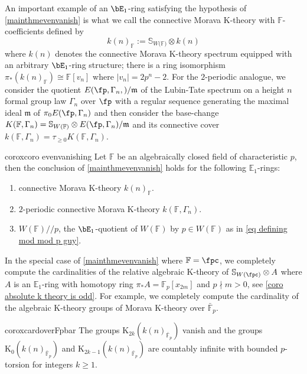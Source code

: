 \documentclass[english,10pt]{amsart}
\newcommand{\sphwf}{\mathbb{S}_{W(\mathbb{F)}}}
\newcommand{\field}{\mathbb{F}}
\theoremstyle{definition}
\numberwithin{equation}{section}
\newcommand{\mmod}{/\!\!/}
\newcommand{\sslash}{\mmod}
\newcommand{\pis}{\pi_*}
\begin{document}
An important example of an $\bE_1$-ring satisfying the hypothesis of \autoref{mainthmevenvanish} is  what we call the connective Morava K-theory with $\field$-coefficients defined by
\[k(n)_{\field}:= \sphwf \otimes k(n)\]
where $k(n)$ denotes the connective Morava K-theory spectrum equipped with an arbitrary $\bE_1$-ring structure; there is a ring isomorphism  $\pis (k(n)_\field) \cong \field[v_n]$ where $\lvert v_n\rvert=2p^n-2$. For the $2$-periodic analogue, we consider the quotient $E(\fp,\Gamma_n,)/\mathfrak{m}$ of the Lubin-Tate spectrum on a height $n$ formal group law $\Gamma_n$ over $\fp$ with a regular sequence generating the maximal ideal $\mathfrak{m}$ of $\pi_0E(\fp,\Gamma_n)$ and then consider the base-change $K(\field,\Gamma_n)=\mathbb{S}_{W(\field)}\otimes E(\fp,\Gamma_n)/\mathfrak{m}$ and its connective cover $k(\field,\Gamma_n)=\tau_{\ge 0}K(\field,\Gamma_n)$.

\begin{restatable}{corox}{coro evenvanishing}
 Let $\field$ be  an algebraically closed field of characteristic $p$, then the conclusion of \autoref{mainthmevenvanish} holds for the following $\mathbb{E}_1$-rings:
\begin{enumerate}
\item connective Morava K-theory $k(n)_{\field}$. 
\item $2$-periodic connective Morava K-theory $k(\field,\Gamma_n)$. 
\item $W(\field)\sslash p$, the $\bE_1$-quotient of $ W(\field)$ by $p \in W(\field)$ as in \eqref{eq defining mod mod p guy}.
\end{enumerate}
\end{restatable}

In the special case of \autoref{mainthmevenvanish} where $\field=\fpc$, we completely compute the cardinalities of the relative algebraic K-theory of $\mathbb{S}_{W(\fpc)}\otimes A$ where $A$ is an $\mathbb{E}_1$-ring with homotopy ring $\pi_*A=\field_p[x_{2m}]$ and $p\nmid m>0$, see \autoref{coro absolute k theory is odd}. For example, we completely compute the cardinality of the algebraic K-theory groups of Morava K-theory over $\bar{\mathbb{F}}_p$. 

\begin{restatable}{corox}{cardoverFpbar}\label{overFpbar}
The groups $\mathrm{K}_{2k}(k(n)_{\bar{\field}_p})$ vanish and the groups $\mathrm{K}_{0}(k(n)_{\bar{\field}_p})$ and $\mathrm{K}_{2k-1}(k(n)_{\bar{\field}_p})$ are countably infinite with bounded $p$-torsion for integers $k\geq 1$. 
\end{restatable}
\end{document}
